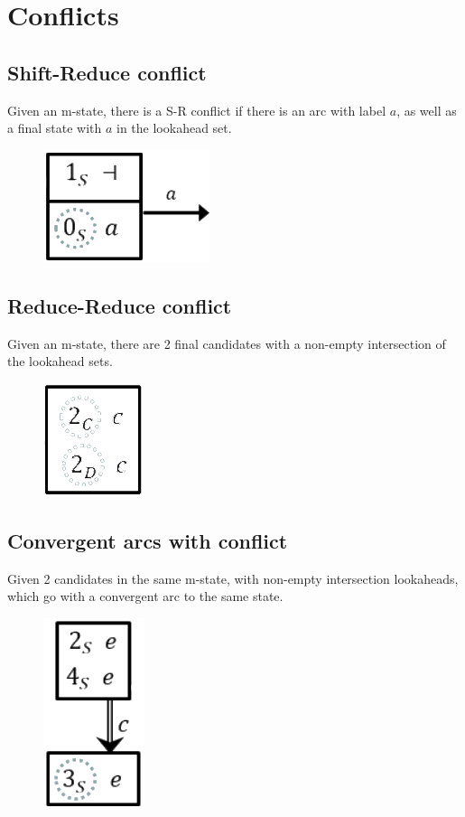 \section{Conflicts}
\subsection{Shift-Reduce conflict}
Given an m-state, there is a S-R conflict if there is an arc with label $a$, as well as a final state with $a$ in the lookahead set.
\begin{figure}[H]
    \centering
    \includegraphics[width=0.2\linewidth]{parsing/shift-reduce-conflict.png}
\end{figure}

\subsection{Reduce-Reduce conflict}
Given an m-state, there are 2 final candidates with a non-empty intersection of the lookahead sets.
\begin{figure}[H]
    \centering
    \includegraphics[width=0.15\linewidth]{parsing/reduce-reduce-conflict.png}
\end{figure}

\subsection{Convergent arcs with conflict}
Given 2 candidates in the same m-state, with non-empty intersection lookaheads, which go with a convergent arc to the same state.
\begin{figure}[H]
    \centering
    \includegraphics[width=0.15\linewidth]{parsing/convergent-conflict.png}
\end{figure}
